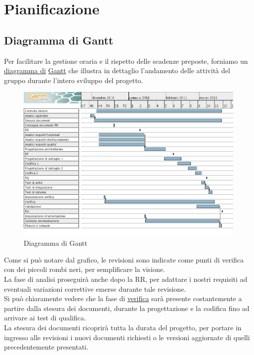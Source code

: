\chapter{Pianificazione}
\thispagestyle{fancy}

\section{Diagramma di Gantt}
Per facilitare la gestione oraria e il rispetto delle scadenze preposte,
forniamo un \underline{diagramma di} \underline{Gantt} che illustra in dettaglio
l'andamento delle attivit\`a del gruppo durante l'intero sviluppo del progetto.
\vspace{0.8cm}
\begin{figure}[htbp]
  \centering
  \includegraphics[width=17.2cm, angle=0]{img/PP/gantt.png}
\caption{Diagramma di Gantt}
\end{figure}
\newpage

Come si pu\`o notare dal grafico, le revisioni sono indicate come punti di 
verifica con dei piccoli rombi neri, per semplificare la visione.\\
La fase di analisi proseguir\`a anche dopo la RR, per adattare i nostri
requisiti ad eventuali variazioni correttive emerse durante tale revisione.\\

Si pu\`o chiaramente vedere che la fase di \underline{verifica} sar\`a presente
costantemente a partire dalla stesura dei documenti, durante la progettazione e
la codifica fino ad arrivare ai test di qualifica.\\

La stesura dei documenti ricoprir\`a tutta la durata del progetto, per portare
in ingresso alle revisioni i nuovi documenti richiesti o le versioni aggiornate
di quelli precedentemente presentati.

